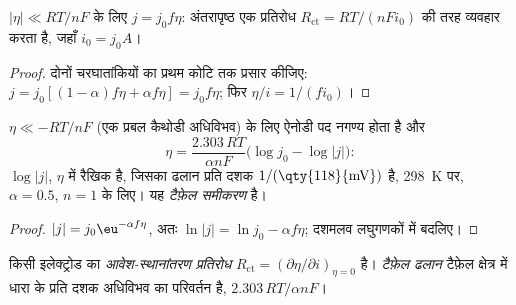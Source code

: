 \begin{corollary}[आवेश-स्थानांतरण प्रतिरोध]\label{cor:b3:electrode-kinetics:linear}
$|\eta| \ll RT/nF$ के लिए $j = j_0f\eta$: अंतरापृष्ठ एक प्रतिरोध
$R_{\mathrm{ct}} = RT/(nFi_0)$ की तरह व्यवहार करता है, जहाँ $i_0 = j_0A$।
\end{corollary}

\begin{proof}
दोनों चरघातांकियों का प्रथम कोटि तक प्रसार कीजिए: $j = j_0[(1 - \alpha)f\eta + \alpha f\eta] = j_0f\eta$; फिर
$\eta/i = 1/(fi_0)$।
\end{proof}

\begin{corollary}[टैफ़ेल समीकरण]\label{cor:b3:electrode-kinetics:tafel}
$\eta \ll -RT/nF$ (एक प्रबल कैथोडी अधिविभव) के लिए ऐनोडी पद
नगण्य होता है और
\[
  \eta = \frac{2.303\,RT}{\alpha nF}\bigl(\log j_0 - \log|j|\bigr):
\]
$\log|j|$, $\eta$ में रैखिक है, जिसका ढलान प्रति दशक $1/(\text{\qty{118}{mV}})$ है, \qty{298}{K} पर, $\alpha = 0.5$, $n =
1$ के लिए। यह \emph{टैफ़ेल समीकरण} है।
\end{corollary}

\begin{proof}
$|j| = j_0\eu^{-\alpha f\eta}$, अतः $\ln|j| = \ln j_0 - \alpha f\eta$; दशमलव लघुगणकों में बदलिए।
\end{proof}

\begin{definition}[आवेश-स्थानांतरण प्रतिरोध, टैफ़ेल ढलान]\label{def:b3:electrode-kinetics:charge-transfer}
किसी इलेक्ट्रोड का \emph{आवेश-स्थानांतरण प्रतिरोध}
$R_{\mathrm{ct}} = (\partial\eta/\partial i)_{\eta = 0}$ है। \emph{टैफ़ेल ढलान}
टैफ़ेल क्षेत्र में धारा के प्रति दशक अधिविभव का परिवर्तन है,
$2.303\,RT/\alpha nF$।
\end{definition}

